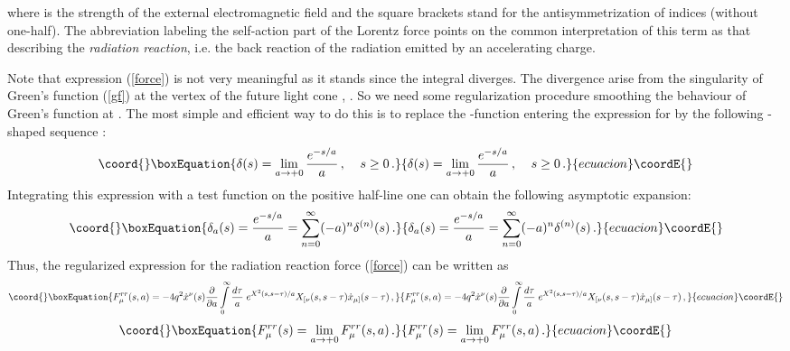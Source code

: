 \documentclass[a4paper,12pt]{article}
\begin{document}
where \coordHE{} is the strength of the external
electromagnetic field and the square brackets stand for the
antisymmetrization of indices (without one-half). The
abbreviation \coordHE{} labeling the self-action part of the Lorentz
force points on the common interpretation of this term as that
describing the \textit{radiation reaction}, i.e. the back reaction
of the radiation emitted by an accelerating charge.


Note that expression (\ref{force}) is not very meaningful as it
stands since the integral diverges. The divergence arise from the
singularity of Green's function (\ref{gf}) at the vertex of the
future light cone \coordHE{}, \coordHE{}. So we need some
regularization procedure smoothing the behaviour of Green's
function \coordHE{} at \coordHE{}. The most simple and efficient way to do
this is to replace the \myHighlight{$\delta$}\coordHE{}-function entering the expression
for \coordHE{} by the following \myHighlight{$\delta$}\coordHE{}-shaped sequence \cite{KLS}:
\begin{equation}\coord{}\boxEquation{\label{reg}
\delta(s)=\lim_{a\rightarrow +0}\frac{e^{-s/a}}{a}\,,\;\;\;\;s\geq
0\,.
}{\delta(s)=\lim_{a\rightarrow +0}\frac{e^{-s/a}}{a}\,,\;\;\;\;s\geq
0\,.
}{ecuacion}\coordE{}\end{equation}
Integrating this expression  with a test function on the positive
half-line one can obtain the following asymptotic expansion:
\begin{equation}\coord{}\boxEquation{ \delta_a(s)=\frac{e^{-
s/a}}{a}=\sum_{n=0}^{\infty}(-a)^n\delta^{(n)}(s)\,.
}{ \delta_a(s)=\frac{e^{-
s/a}}{a}=\sum_{n=0}^{\infty}(-a)^n\delta^{(n)}(s)\,.
}{ecuacion}\coordE{}\end{equation}
Thus, the regularized expression for the radiation reaction force
(\ref{force}) can be written as
\begin{equation}\coord{}\boxEquation{\label{flornonreg}
F^{rr}_\mu(s,a)=-4q^2\dot{x}^\nu (s)\frac \partial {\partial
a}\int\limits_0^\infty \frac{d\tau}{a}\;{ e^{X^2(s,s-\tau)/a}}
X_{[\nu}(s,s-\tau)\dot{x}_{\mu] }(s-\tau ) \,,
}{F^{rr}_\mu(s,a)=-4q^2\dot{x}^\nu (s)\frac \partial {\partial
a}\int\limits_0^\infty \frac{d\tau}{a}\;{ e^{X^2(s,s-\tau)/a}}
X_{[\nu}(s,s-\tau)\dot{x}_{\mu] }(s-\tau ) \,,
}{ecuacion}\coordE{}\end{equation}
\begin{equation*}\coord{}\boxEquation{
F^{rr}_\mu (s)=\lim_{a\rightarrow +0}F^{rr}_\mu(s,a)\,.
}{
F^{rr}_\mu (s)=\lim_{a\rightarrow +0}F^{rr}_\mu(s,a)\,.
}{ecuacion}\coordE{}\end{equation*}
\end{document}
